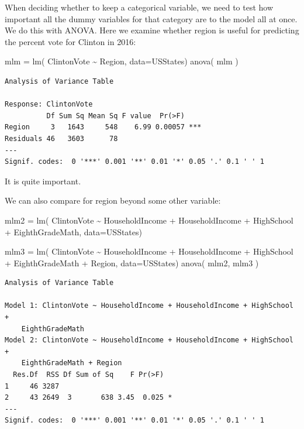 \documentclass[
  letterpaper,
  DIV=11,
  numbers=noendperiod]{scrreprt}
\newenvironment{Shaded}{}{}
\newcommand{\AttributeTok}[1]{\textcolor[rgb]{0.49,0.56,0.16}{#1}}
\newcommand{\FunctionTok}[1]{\textcolor[rgb]{0.02,0.16,0.49}{#1}}
\newcommand{\NormalTok}[1]{#1}
\newcommand{\OtherTok}[1]{\textcolor[rgb]{0.00,0.44,0.13}{#1}}
\newcommand{\SpecialCharTok}[1]{\textcolor[rgb]{0.25,0.44,0.63}{#1}}
\begin{document}
When deciding whether to keep a categorical variable, we need to test
how important all the dummy variables for that category are to the model
all at once. We do this with ANOVA. Here we examine whether region is
useful for predicting the percent vote for Clinton in 2016:

\begin{Shaded}
\begin{Highlighting}[]
\NormalTok{mlm }\OtherTok{=} \FunctionTok{lm}\NormalTok{( ClintonVote }\SpecialCharTok{\textasciitilde{}}\NormalTok{ Region, }\AttributeTok{data=}\NormalTok{USStates)}
\FunctionTok{anova}\NormalTok{( mlm )}
\end{Highlighting}
\end{Shaded}

\begin{verbatim}
Analysis of Variance Table

Response: ClintonVote
          Df Sum Sq Mean Sq F value  Pr(>F)    
Region     3   1643     548    6.99 0.00057 ***
Residuals 46   3603      78                    
---
Signif. codes:  0 '***' 0.001 '**' 0.01 '*' 0.05 '.' 0.1 ' ' 1
\end{verbatim}

It is quite important.

We can also compare for region beyond some other variable:

\begin{Shaded}
\begin{Highlighting}[]
\NormalTok{mlm2 }\OtherTok{=} \FunctionTok{lm}\NormalTok{( ClintonVote }\SpecialCharTok{\textasciitilde{}}\NormalTok{ HouseholdIncome }\SpecialCharTok{+}\NormalTok{ HouseholdIncome }\SpecialCharTok{+}\NormalTok{ HighSchool }\SpecialCharTok{+} 
\NormalTok{               EighthGradeMath, }\AttributeTok{data=}\NormalTok{USStates)}

\NormalTok{mlm3 }\OtherTok{=} \FunctionTok{lm}\NormalTok{( ClintonVote }\SpecialCharTok{\textasciitilde{}}\NormalTok{ HouseholdIncome }\SpecialCharTok{+}\NormalTok{ HouseholdIncome }\SpecialCharTok{+}\NormalTok{ HighSchool }\SpecialCharTok{+} 
\NormalTok{               EighthGradeMath }\SpecialCharTok{+}\NormalTok{ Region, }\AttributeTok{data=}\NormalTok{USStates)}
\FunctionTok{anova}\NormalTok{( mlm2, mlm3 )}
\end{Highlighting}
\end{Shaded}

\begin{verbatim}
Analysis of Variance Table

Model 1: ClintonVote ~ HouseholdIncome + HouseholdIncome + HighSchool + 
    EighthGradeMath
Model 2: ClintonVote ~ HouseholdIncome + HouseholdIncome + HighSchool + 
    EighthGradeMath + Region
  Res.Df  RSS Df Sum of Sq    F Pr(>F)  
1     46 3287                           
2     43 2649  3       638 3.45  0.025 *
---
Signif. codes:  0 '***' 0.001 '**' 0.01 '*' 0.05 '.' 0.1 ' ' 1
\end{verbatim}
\end{document}
